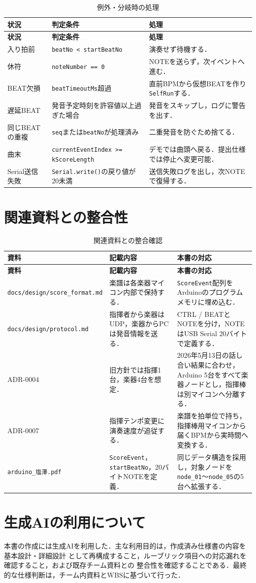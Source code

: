 \documentclass[uplatex,dvipdfmx]{jlreq}
\newcommand{\code}[1]{\texttt{#1}}
\begin{document}
\begin{longtable}{p{}p{}p{}}
\caption{例外・分岐時の処理}\label{tab:exceptions}\\
\toprule
\textbf{状況} & \textbf{判定条件} & \textbf{処理} \\
\midrule
\endfirsthead
\toprule
\textbf{状況} & \textbf{判定条件} & \textbf{処理} \\
\midrule
\endhead
入り拍前 & \code{beatNo < startBeatNo} & 演奏せず待機する．\\
休符 & \code{noteNumber == 0} & NOTEを送らず，次イベントへ進む．\\
BEAT欠損 & \code{beatTimeoutMs}超過 & 直前BPMから仮想BEATを作り\code{SelfRun}する．\\
遅延BEAT & 発音予定時刻を許容値以上過ぎた場合 & 発音をスキップし，ログに警告を出す．\\
同じBEATの重複 & \code{seq}または\code{beatNo}が処理済み & 二重発音を防ぐため捨てる．\\
曲末 & \code{currentEventIndex >= kScoreLength} & デモでは曲頭へ戻る．提出仕様では停止へ変更可能．\\
Serial送信失敗 & \code{Serial.write()}の戻り値が20未満 & 送信失敗ログを出し，次NOTEで復帰する．\\
\bottomrule
\end{longtable}

\section{関連資料との整合性}

\begin{longtable}{p{}p{}p{}}
\caption{関連資料との整合確認}\label{tab:consistency}\\
\toprule
\textbf{資料} & \textbf{記載内容} & \textbf{本書の対応} \\
\midrule
\endfirsthead
\toprule
\textbf{資料} & \textbf{記載内容} & \textbf{本書の対応} \\
\midrule
\endhead
\code{docs/design/score\_format.md} &
楽譜は各楽器マイコン内部で保持する． &
\code{ScoreEvent}配列をArduinoのプログラムメモリに埋め込む．\\
\code{docs/design/protocol.md} &
指揮者から楽器はUDP，楽器からPCは発音情報を送る． &
CTRL / BEATとNOTEを分け，NOTEはUSB Serial 20バイトで定義する．\\
ADR-0004 &
旧方針では指揮1台，楽器4台を想定． &
2026年5月13日の話し合い結果に合わせ，Arduino 5台をすべて楽器ノードとし，指揮棒は別マイコンへ分離する．\\
ADR-0007 &
指揮テンポ変更に演奏速度が追従する． &
楽譜を拍単位で持ち，指揮棒用マイコンから届くBPMから実時間へ変換する．\\
\code{arduino\_塩澤.pdf} &
\code{ScoreEvent}，\code{startBeatNo}，20バイトNOTEを定義． &
同じデータ構造を採用し，対象ノードを\code{node\_01}〜\code{node\_05}の5台へ拡張する．\\
\bottomrule
\end{longtable}

\section{生成AIの利用について}

本書の作成には生成AIを利用した．主な利用目的は，作成済み仕様書の内容を基本設計・詳細設計
として再構成すること，ルーブリック項目への対応漏れを確認すること，および既存チーム資料との
整合性を確認することである．最終的な仕様判断は，チーム内資料とWBSに基づいて行った．
\end{document}
